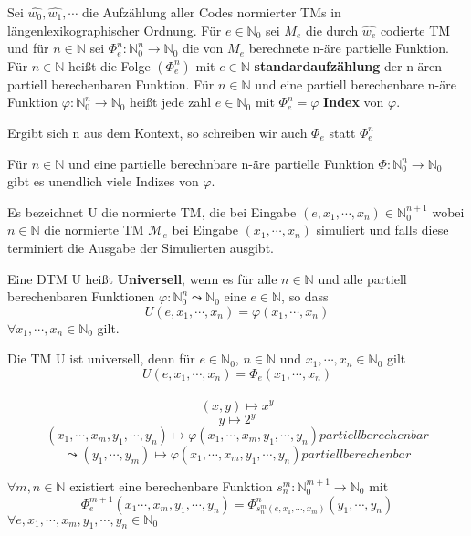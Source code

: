  Sei $\hat{w_0}, \hat{w_1}, \cdots$ die Aufzählung aller Codes normierter TMs in längenlexikographischer Ordnung. Für $e \in \mathbb{N}_0$ sei $M_e$ die durch $\hat{w_e}$ codierte TM und für $n \in \mathbb{N}$ sei $\Phi_e^n : \mathbb{N}_0^n \rightarrow \mathbb{N}_0$ die von $M_e$ berechnete n-äre partielle Funktion. Für $n \in \mathbb{N}$ heißt die Folge $(\Phi_e^n)$ mit $e\in \mathbb{N}$ \textbf{standardaufzählung} der n-ären partiell berechenbaren Funktion. Für $n \in \mathbb{N} $ und eine partiell berechenbare n-äre Funktion $\varphi: \mathbb{N}_0^n \rightarrow \mathbb{N}_0$ heißt jede zahl $e \in \mathbb{N}_0$ mit $\Phi_e^n = \varphi$ \textbf{Index} von $\varphi$.

 Ergibt sich n aus dem Kontext, so schreiben wir auch $\Phi_e$ statt $\Phi_e^n$

 Für $n \in \mathbb{N}$ und eine partielle berechnbare n-äre partielle Funktion $\Phi : \mathbb{N}_0^n \rightarrow \mathbb{N}_0$ gibt es unendlich viele Indizes von $\varphi$.

 Es bezeichnet U die normierte TM, die bei Eingabe $(e, x_1, \cdots, x_n) \in \mathbb{N}_0^{n+1}$ wobei $n \in \mathbb{N}$ die normierte TM $\mathcal{M}_e$ bei Eingabe $(x_1, \cdots, x_n)$ simuliert und falls diese terminiert die Ausgabe der Simulierten ausgibt.

 Eine DTM U heißt \textbf{Universell}, wenn es für alle $n \in \mathbb{N}$ und alle partiell berechenbaren Funktionen $\varphi : \mathbb{N}_0^n \leadsto \mathbb{N}_0$ eine $e \in \mathbb{N}$, so dass \[U(e, x_1, \cdots, x_n) = \varphi(x_1, \cdots, x_n)\] $\forall x_1, \cdots, x_n \in \mathbb{N}_0$ gilt.

 \sloppy Die TM U ist universell, denn für $e \in \mathbb{N}_0$, $n \in \mathbb{N}$ und $x_1, \cdots, x_n \in \mathbb{N}_0$ gilt \[U(e,x_1, \cdots, x_n) = \Phi_e(x_1, \cdots, x_n)\]\\ \[(x, y) \mapsto x^y\] \[y \mapsto 2^y\] \[(x_1, \cdots, x_m, y_1, \cdots, y_n) \mapsto \varphi(x_1, \cdots, x_m, y_1, \cdots, y_n) partiell berechenbar\] \[\leadsto (y_1,\cdots, y_m) \mapsto \varphi(x_1, \cdots, x_m, y_1, \cdots, y_n) partiell berechenbar \]

 $\forall m, n \in \mathbb{N}$ existiert eine berechenbare Funktion $s_n^m : \mathbb{N}_0^{m+1} \to \mathbb{N}_0$ mit \[\Phi_e^{m+1}(x_1\cdots, x_m, y_1, \cdots, y_n) = \Phi_{s_n^m(e, x_1, \cdots, x_m)}^n (y_1, \cdots, y_n)\] $\forall e, x_1, \cdots, x_m, y_1, \cdots, y_n \in \mathbb{N}_0$

